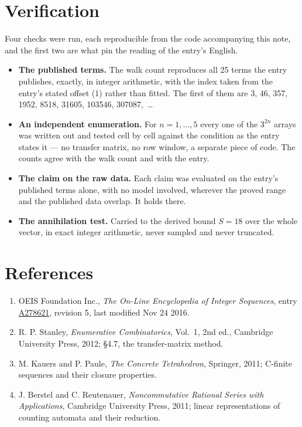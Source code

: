 \documentclass[11pt]{article}
\theoremstyle{definition}
\begin{document}
\section{Verification}

Four checks were run, each reproducible from the code accompanying this note, and the first two are what pin the reading of the entry's English.

\begin{itemize}

\item {\bfseries The published terms.} The walk count reproduces all 25 terms the entry publishes, exactly, in integer arithmetic, with the index taken from the entry's stated offset (1) rather than fitted. The first of them are 3, 46, 357, 1952, 8518, 31605, 103546, 307087,~\dots

\item {\bfseries An independent enumeration.} For $n = 1,\dots,5$ every one of the $3^{2n}$ arrays was written out and tested cell by cell against the condition as the entry states it --- no transfer matrix, no row window, a separate piece of code. The counts agree with the walk count and with the entry.

\item {\bfseries The claim on the raw data.} Each claim was evaluated on the entry's published terms alone, with no model involved, wherever the proved range and the published data overlap. It holds there.

\item {\bfseries The annihilation test.} Carried to the derived bound $S = 18$ over the whole vector, in exact integer arithmetic, never sampled and never truncated.

\end{itemize}

\section{References}

\begin{enumerate}

\item OEIS Foundation Inc., \emph{The On-Line Encyclopedia of Integer Sequences}, entry \href{https://oeis.org/A278621}{A278621}, revision 5, last modified Nov 24 2016.

\item R. P. Stanley, \emph{Enumerative Combinatorics}, Vol.~1, 2nd ed., Cambridge University Press, 2012; \S4.7, the transfer-matrix method.

\item M. Kauers and P. Paule, \emph{The Concrete Tetrahedron}, Springer, 2011; C-finite sequences and their closure properties.

\item J. Berstel and C. Reutenauer, \emph{Noncommutative Rational Series with Applications}, Cambridge University Press, 2011; linear representations of counting automata and their reduction.

\end{enumerate}
\end{document}
